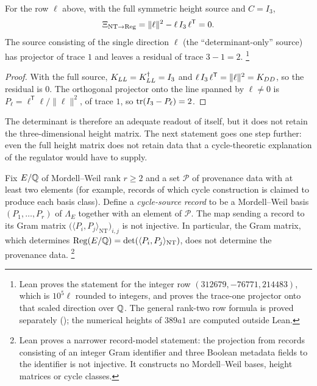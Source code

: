\begin{theorem}\label{thm:apparatus:rank-two-height-schur-collapse}
For the row $\ell$ above, with the full symmetric height source and
$C=I_3$,
\[
  \Xi_{\mathrm{NT}\to\operatorname{Reg}}=\|\ell\|^2-\ell\,I_3\,\ell^{\mathsf T}=0 .
\]
The source consisting of the single direction $\ell$ (the
``determinant-only'' source) has projector of trace $1$ and leaves a
residual of trace $3-1=2$.%
\footnote{Lean proves the statement for the integer row
$(312679,-76771,214483)$, which is $10^5\ell$ rounded to integers, and
proves the trace-one projector onto that scaled direction over $\mathbb{Q}$.  The
general rank-two row formula is proved separately
(); the numerical heights of
$389a1$ are computed outside Lean.}
\end{theorem}

\begin{proof}
With the full source, $K_{LL}=K_{LL}^{\dagger}=I_3$ and
$\ell\,I_3\,\ell^{\mathsf T}=\|\ell\|^2=K_{DD}$, so the residual is $0$.  The
orthogonal projector onto the line spanned by $\ell\neq0$ is
$P_\ell=\ell^{\mathsf T}\ell/\|\ell\|^2$, of trace $1$, so
$\operatorname{tr}(I_3-P_\ell)=2$.
\end{proof}

The determinant is therefore an adequate readout of itself, but it does
not retain the three-dimensional height matrix.  The next statement goes
one step further: even the full height matrix does not retain data that a
cycle-theoretic explanation of the regulator would have to supply.

\begin{theorem}\label{thm:apparatus:gram-matrix-shadow}
Fix $E/\mathbb{Q}$ of Mordell--Weil rank $r\ge2$ and a set $\mathcal P$ of
provenance data with at least two elements (for example, records of which
cycle construction is claimed to produce each basis class).  Define a
\emph{cycle-source record} to be a Mordell--Weil basis
$(P_1,\ldots,P_r)$ of $\Lambda_E$ together with an element of
$\mathcal P$.
The map sending a record to its Gram matrix
$\bigl(\langle P_i,P_j\rangle_{\mathrm{NT}}\bigr)_{i,j}$ is not injective.
In particular, the Gram matrix, which determines
$\operatorname{Reg}(E/\mathbb{Q})=\det(\langle P_i,P_j\rangle_{\mathrm{NT}})$, does not determine
the provenance data.%
\footnote{Lean proves a narrower record-model statement: the projection
from records consisting of an integer Gram identifier and three Boolean
metadata fields to the identifier is not injective.  It constructs no
Mordell--Weil bases, height matrices or cycle classes.}
\end{theorem}

